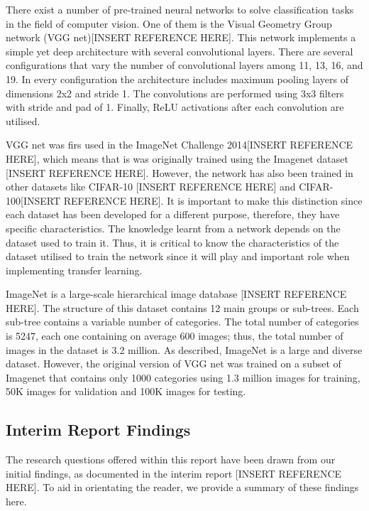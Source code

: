 \documentclass{article}
\begin{document}
There exist a number of pre-trained neural networks to solve classification tasks in the field of computer vision. One of them is the Visual Geometry Group network (VGG net)[INSERT REFERENCE HERE]. This network implements a simple yet deep architecture with several convolutional layers. There are several configurations that vary the number of convolutional layers among 11, 13, 16, and 19. In every configuration the architecture includes maximum pooling layers of dimensions 2x2 and stride 1. The convolutions are performed using 3x3 filters with stride and pad of 1. Finally, ReLU activations after each convolution are utilised.

VGG net was firs used in the ImageNet Challenge 2014[INSERT REFERENCE HERE], which means that is was originally trained using the Imagenet dataset [INSERT REFERENCE HERE]. However, the network has also been trained in other datasets like CIFAR-10 [INSERT REFERENCE HERE] and CIFAR-100[INSERT REFERENCE HERE]. It is important to make this distinction since each dataset has been developed for a different purpose, therefore, they have specific characteristics. The knowledge learnt from a network depends on the dataset used to train it. Thus, it is critical to know the characteristics of the dataset utilised to train the network since it will play and important role when implementing transfer learning.

ImageNet is a large-scale hierarchical image database [INSERT REFERENCE HERE]. The structure of this dataset contains 12 main groups or sub-trees. Each sub-tree contains a variable number of categories. The total number of categories is 5247, each one containing on average 600 images; thus, the total number of images in the dataset is 3.2 million. As described, ImageNet is a large and diverse dataset. However, the original version of VGG net was trained on a subset of Imagenet that contains only 1000 categories using 1.3 million images for training, 50K images for validation and 100K images for testing.



\subsection{Interim Report Findings}
\label{sec:findings}

The research questions offered within this report have been drawn from our initial findings, as documented in the interim report [INSERT REFERENCE HERE]. To aid in orientating the reader, we provide a summary of these findings here.
\end{document}

